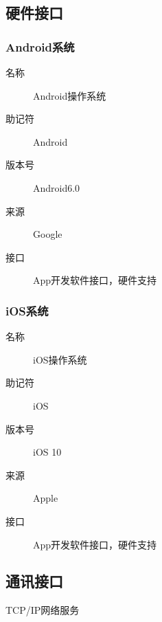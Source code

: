     \subsection{硬件接口}
     \subsubsection{Android系统}
	    \begin{center}\begin{description}
      \item[名称] Android操作系统
      \item[助记符] Android
      \item[版本号]Android6.0
	\item[来源] Google
	\item[接口] App开发软件接口，硬件支持
	\end{description}\end{center}

    \subsubsection{iOS系统}
	\begin{center}\begin{description}
      \item[名称] iOS操作系统
      \item[助记符] iOS
      \item[版本号] iOS 10
	    \item[来源] Apple
	    \item[接口] App开发软件接口，硬件支持
	\end{description}\end{center}

  \subsection{通讯接口}
	TCP/IP网络服务
